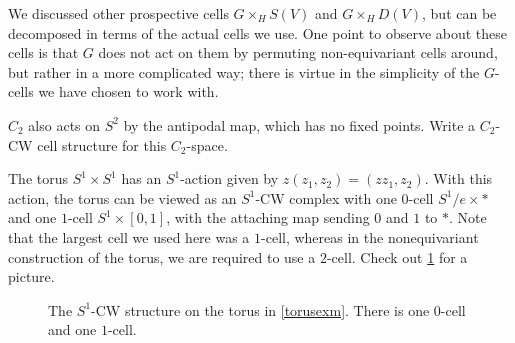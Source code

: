We discussed other prospective cells $G\times_H S(V)$ and $G\times_H D(V)$, but can be decomposed in terms of the
actual cells we use. One point to observe about these cells is that $G$ does not act on them by permuting
non-equivariant cells around, but rather in a more complicated way; there is virtue in the simplicity of the
$G$-cells we have chosen to work with.

\begin{ex}
$C_2$ also acts on $S^2$ by the antipodal map, which has no fixed points. Write a $C_2$-CW cell structure for this
$C_2$-space.
\end{ex}

\begin{exm}
\label{torusexm}
The torus $S^1 \times S^1$ has an $S^1$-action given by $z(z_1, z_2) = (zz_1, z_2)$. With this action, the torus
can be viewed as an $S^1$-CW complex with one $0$-cell $S^1/e \times *$ and one $1$-cell $S^1 \times [0,1]$, with
the attaching map sending $0$ and $1$ to $*$. Note that the largest cell we used here was a $1$-cell, whereas in
the nonequivariant construction of the torus, we are required to use a $2$-cell. Check out
\cref{equivariant_torus} for a picture.
\begin{figure}[h!]
\def\torlen{3}
\caption{The $S^1$-CW structure on the torus in \cref{torusexm}. There is one $0$-cell and one $1$-cell.}
\label{equivariant_torus}
\end{figure}
\end{exm}
